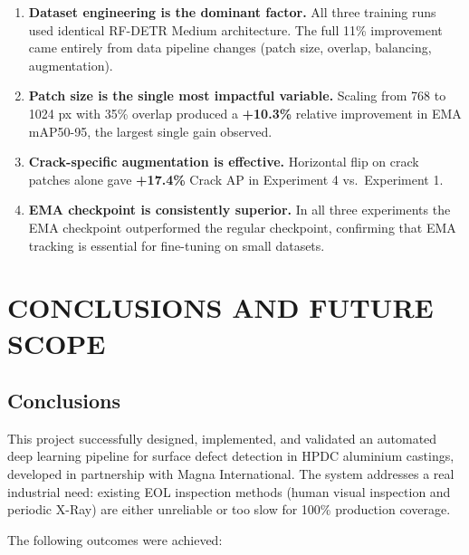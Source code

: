 \begin{enumerate}[leftmargin=2em]
    \item \textbf{Dataset engineering is the dominant factor.} All three training runs used identical RF-DETR Medium architecture. The full 11\% improvement came entirely from data pipeline changes (patch size, overlap, balancing, augmentation).
    \item \textbf{Patch size is the single most impactful variable.} Scaling from 768 to 1024 px with 35\% overlap produced a \textbf{+10.3\%} relative improvement in EMA mAP50-95, the largest single gain observed.
    \item \textbf{Crack-specific augmentation is effective.} Horizontal flip on crack patches alone gave \textbf{+17.4\%} Crack AP in Experiment 4 vs.\ Experiment 1.
    \item \textbf{EMA checkpoint is consistently superior.} In all three experiments the EMA checkpoint outperformed the regular checkpoint, confirming that EMA tracking is essential for fine-tuning on small datasets.
\end{enumerate}

\chapter{CONCLUSIONS AND FUTURE SCOPE}

\section*{Conclusions}

This project successfully designed, implemented, and validated an automated deep learning pipeline for surface defect detection in HPDC aluminium castings, developed in partnership with Magna International. The system addresses a real industrial need: existing EOL inspection methods (human visual inspection and periodic X-Ray) are either unreliable or too slow for 100\% production coverage.

The following outcomes were achieved:

